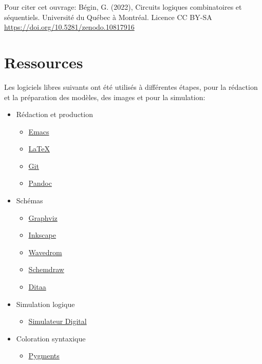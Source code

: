 \documentclass[letter, oneside]{book}
\begin{document}
Pour citer cet ouvrage: Bégin, G. (2022), Circuits logiques
combinatoires et séquentiels. Université du Québec à Montréal. Licence CC BY-SA
\url{https://doi.org/10.5281/zenodo.10817916}

\begin{center}
\href{https://uqam.ca/}{} 
\end{center}

\section*{Ressources}
\label{sec:orgcda156f}

Les logiciels libres suivants ont été utilisés à différentes étapes,
pour la rédaction et la préparation des modèles, des images et pour la
simulation:

\begin{itemize}
\item Rédaction et production
\begin{itemize}
\item \href{https://www.gnu.org/software/emacs/}{Emacs}
\item \href{https://www.latex-project.org/}{\LaTeX{}}
\item \href{https://git-scm.com}{Git}
\item \href{https://pandoc.org/}{Pandoc}
\end{itemize}
\item Schémas
\begin{itemize}
\item \href{https://graphviz.org/}{Graphviz}
\item \href{https://inkscape.org}{Inkscape}
\item \href{https://wavedrom.com/}{Wavedrom}
\item \href{https://schemdraw.readthedocs.io/en/latest/}{Schemdraw}
\item \href{https://ditaa.sourceforge.net/}{Ditaa}
\end{itemize}
\item Simulation logique
\begin{itemize}
\item \href{https://github.com/hneemann/Digital}{Simulateur Digital}
\end{itemize}
\item Coloration syntaxique
\begin{itemize}
\item \href{https://pygments.org/docs/quickstart/}{Pygments}
\end{itemize}
\end{itemize}
\end{document}
